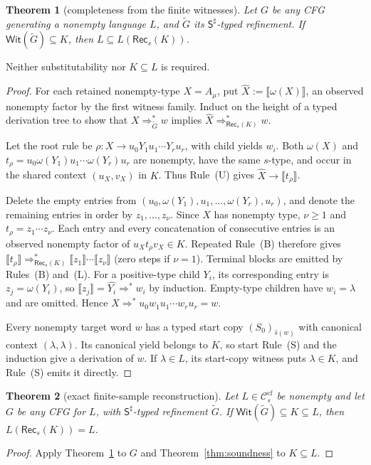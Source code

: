 \documentclass[11pt,a4paper]{article}
\newcommand{\NT}[1]{\llbracket #1\rrbracket}
\newtheorem{theorem}{Theorem}[section]
\theoremstyle{remark}
\theoremstyle{plain}
\newcommand{\WitnessSet}{\mathsf{Wit}}
\newcommand{\cf}{\mathrm{cf}}
\newcommand{\Ccf}[1]{\mathcal C_{#1}^{\cf}}
\begin{document}
\begin{theorem}[completeness from the finite witnesses]\label{thm:complete}
Let $G$ be any CFG generating a nonempty language
$L$, and $\widetilde G$ its $\mathsf S^\sharp$-typed
refinement.  If $\WitnessSet(\widetilde G)\subseteq K$,
then $L\subseteq L(\mathsf{Rec}_s(K))$.
\end{theorem}
Neither substitutability nor $K\subseteq L$ is required.
\begin{proof}
For each retained nonempty-type $X=A_\mu$, put
$\widehat X:=\NT{\omega(X)}$, an observed nonempty factor
by the first witness family.  Induct on the height of a
typed derivation tree to show that
$X\Rightarrow_{\widetilde G}^*w$ implies
$\widehat X\Rightarrow_{\mathsf{Rec}_s(K)}^*w$.

Let the root rule be
$\rho:X\to u_0Y_1u_1\cdots Y_ru_r$, with child yields $w_i$.
Both $\omega(X)$ and
$t_\rho=u_0\omega(Y_1)u_1\cdots\omega(Y_r)u_r$
are nonempty, have the same $s$-type, and occur in
the shared context $(u_X,v_X)$ in $K$.
Thus Rule~\textup{(U)} gives $\widehat X\to\NT{t_\rho}$.

Delete the empty entries from
$(u_0,\omega(Y_1),u_1,\ldots,\omega(Y_r),u_r)$,
and denote the remaining entries in order by
$z_1,\ldots,z_\nu$.  Since $X$ has nonempty type,
$\nu\ge1$ and $t_\rho=z_1\cdots z_\nu$.
Each entry and every concatenation of consecutive
entries is an observed nonempty factor of
$u_Xt_\rho v_X\in K$.  Repeated Rule~\textup{(B)}
therefore gives
$\NT{t_\rho}\Rightarrow_{\mathsf{Rec}_s(K)}^*
\NT{z_1}\cdots\NT{z_\nu}$
(zero steps if $\nu=1$).
Terminal blocks are emitted by Rules~\textup{(B)}
and~\textup{(L)}.  For a positive-type child $Y_i$,
its corresponding entry is $z_j=\omega(Y_i)$,
so $\NT{z_j}=\widehat{Y_i}\Rightarrow^*w_i$
by induction.  Empty-type children have $w_i=\lambda$
and are omitted.  Hence
$\widehat X\Rightarrow^*
u_0w_1u_1\cdots w_ru_r=w$.

Every nonempty target word $w$ has a typed start
copy $(S_0)_{\widehat s(w)}$ with canonical context
$(\lambda,\lambda)$.  Its canonical yield belongs
to $K$, so start Rule~\textup{(S)} and the induction
give a derivation of $w$.  If $\lambda\in L$,
its start-copy witness puts $\lambda\in K$,
and Rule~\textup{(S)} emits it directly.
\end{proof}

\begin{theorem}[exact finite-sample reconstruction]
\label{thm:reconstruction-fixed-s}
Let $L\in\Ccf{s}$ be nonempty and let $G$ be
any CFG for $L$, with
$\mathsf S^\sharp$-typed refinement $\widetilde G$.
If $\WitnessSet(\widetilde G)\subseteq K\subseteq L$,
then $L(\mathsf{Rec}_s(K))=L$.
\end{theorem}
\begin{proof}
Apply Theorem~\ref{thm:complete} to $G$
and Theorem~\ref{thm:soundness} to $K\subseteq L$.
\end{proof}
\end{document}
